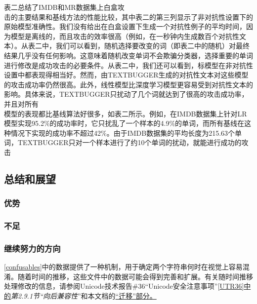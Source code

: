 \documentclass[
]{article}
\begin{document}
表二总结了IMDB和MR数据集上白盒攻\\
击的主要结果和基线方法的性能比较，其中表二的第三列显示了非对抗性设置下的原始模型准确性。我们没有给出在白盒设置下生成一个对抗性例子的平均时间，因为模型是离线的，而且攻击的效率很高（例如，在一秒钟内生成数百个对抗性文本）。从表二中，我们可以看到，随机选择要改变的词（即表二中的随机）对最终结果几乎没有任何影响。这意味着随机改变单词不会欺骗分类器，选择重要的单词进行修改是成功攻击的必要条件。从表二中，我们还可以看到，标模型在非对抗性设置中都表现得相当好。然而，由TEXTBUGGER生成的对抗性文本对这些模型的攻击成功率仍然很高。此外，线性模型比深度学习模型更容易受到对抗性文本的影响。具体来说，TEXTBUGGER只扰动了几个词就达到了很高的攻击成功率，并且对所有\\
模型的表现都比基线算法好很多，如表二所示。例如，在IMDB数据集上针对LR模型实现95.2\%的成功率时，它只扰乱了一个样本的4.9\%的单词，而所有基线在这种情况下实现的成功率不超过42\%。由于IMDB数据集的平均长度为215.63个单词，TEXTBUGGER只对一个样本进行了约10个单词的扰动，就能进行成功的攻击

\hypertarget{ux603bux7ed3ux548cux5c55ux671b}{%
\subsection{总结和展望}\label{ux603bux7ed3ux548cux5c55ux671b}}

\hypertarget{ux4f18ux52bf}{%
\subsubsection{优势}\label{ux4f18ux52bf}}

\hypertarget{ux4e0dux8db3}{%
\subsubsection{不足}\label{ux4e0dux8db3}}

\hypertarget{ux7ee7ux7eedux52aaux529bux7684ux65b9ux5411}{%
\subsubsection{继续努力的方向}\label{ux7ee7ux7eedux52aaux529bux7684ux65b9ux5411}}

{[}\href{https://www-unicode-org.translate.goog/reports/tr39/tr39-22.html?_x_tr_sl=auto\&_x_tr_tl=zh-CN\&_x_tr_hl=zh-CN\#confusables}{confusables}{]}中的数据提供了一种机制，用于确定两个字符串何时在视觉上容易混淆。随着时间的推移，这些文件中的数据可能会得到完善和扩展。有关随时间推移处理修改的信息，请参阅Unicode技术报告\#36``Unicode安全注意事项''{[}\href{https://www-unicode-org.translate.goog/reports/tr39/tr39-22.html?_x_tr_sl=auto\&_x_tr_tl=zh-CN\&_x_tr_hl=zh-CN\#UTR36}{UTR36{]}中的}\emph{第2.9.1节``向后兼容性}''和本文档的\href{https://www-unicode-org.translate.goog/reports/tr39/tr39-22.html?_x_tr_sl=auto\&_x_tr_tl=zh-CN\&_x_tr_hl=zh-CN\#Migration}{``迁移''部分。}
\end{document}
